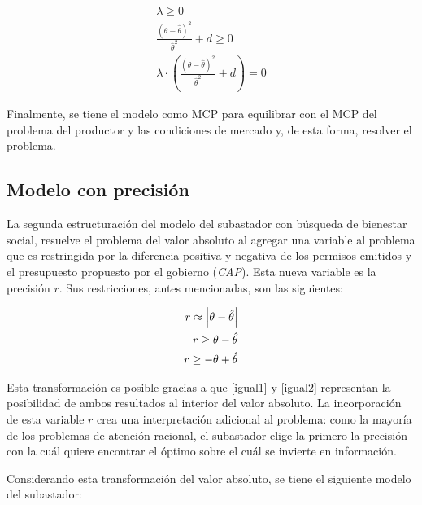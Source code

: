\begin{footnotesize}
\begin{align}
    \lambda \geq 0 \\
  \frac{(\theta-\hat{\theta})^2}{\hat{\theta}^2 }+ d \geq 0 \\
    \lambda \cdot (\frac{(\theta-\hat{\theta})^2}{\hat{\theta}^2 }+ d)=0
\end{align}
\end{footnotesize}

Finalmente, se tiene el modelo como MCP para equilibrar con el MCP del problema del productor y las condiciones de mercado y, de esta forma, resolver el problema.


\subsection{Modelo con precisión}\label{modeloconprecision}

La segunda estructuración del modelo del subastador con búsqueda de bienestar social, resuelve el problema del valor absoluto al agregar una variable al problema que es restringida por la diferencia positiva y negativa de los permisos emitidos y el presupuesto propuesto por el gobierno (\textit{CAP}). Esta nueva variable es la precisión $r$. Sus restricciones, antes mencionadas, son las siguientes: 

\begin{align}
   r \approx \abs{\theta - \hat{\theta}}\\
   r \geq \theta - \hat{\theta}\label{igual1}\\
   r \geq -\theta + \hat{\theta}\label{igual2}
\end{align}

Esta transformación es posible gracias a que \ref{igual1} y \ref{igual2} representan la posibilidad de ambos resultados al interior del valor absoluto. La incorporación de esta variable $r$ crea una interpretación adicional al problema:  como la mayoría de los problemas de atención racional, el subastador elige la primero la precisión con la cuál quiere encontrar el óptimo sobre el cuál se invierte en información. 
\vspace{2.5mm}

Considerando esta transformación del valor absoluto, se tiene el siguiente modelo del subastador:
\newpage

